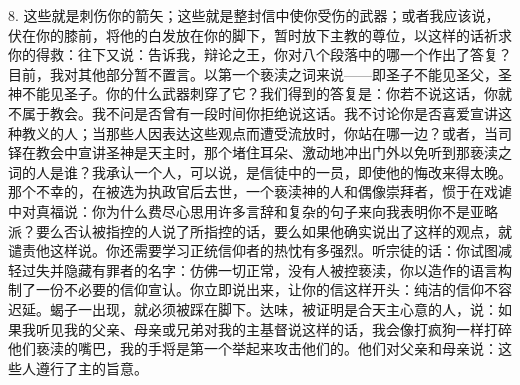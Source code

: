 8. 这些就是刺伤你的箭矢；这些就是整封信中使你受伤的武器；或者我应该说，伏在你的膝前，将他的白发放在你的脚下，暂时放下主教的尊位，以这样的话祈求你的得救：往下又说：告诉我，辩论之王，你对八个段落中的哪一个作出了答复？目前，我对其他部分暂不置言。以第一个亵渎之词来说——即圣子不能见圣父，圣神不能见圣子。你的什么武器刺穿了它？我们得到的答复是：你若不说这话，你就不属于教会。我不问是否曾有一段时间你拒绝说这话。我不讨论你是否喜爱宣讲这种教义的人；当那些人因表达这些观点而遭受流放时，你站在哪一边？或者，当司铎在教会中宣讲圣神是天主时，那个堵住耳朵、激动地冲出门外以免听到那亵渎之词的人是谁？我承认一个人，可以说，是信徒中的一员，即使他的悔改来得太晚。那个不幸的，在被选为执政官后去世，一个亵渎神的人和偶像崇拜者，惯于在戏谑中对真福说：你为什么费尽心思用许多言辞和复杂的句子来向我表明你不是亚略派？要么否认被指控的人说了所指控的话，要么如果他确实说出了这样的观点，就谴责他这样说。你还需要学习正统信仰者的热忱有多强烈。听宗徒的话：你试图减轻过失并隐藏有罪者的名字：仿佛一切正常，没有人被控亵渎，你以造作的语言构制了一份不必要的信仰宣认。你立即说出来，让你的信这样开头：纯洁的信仰不容迟延。蝎子一出现，就必须被踩在脚下。达味，被证明是合天主心意的人，说：如果我听见我的父亲、母亲或兄弟对我的主基督说这样的话，我会像打疯狗一样打碎他们亵渎的嘴巴，我的手将是第一个举起来攻击他们的。他们对父亲和母亲说：这些人遵行了主的旨意。\par


